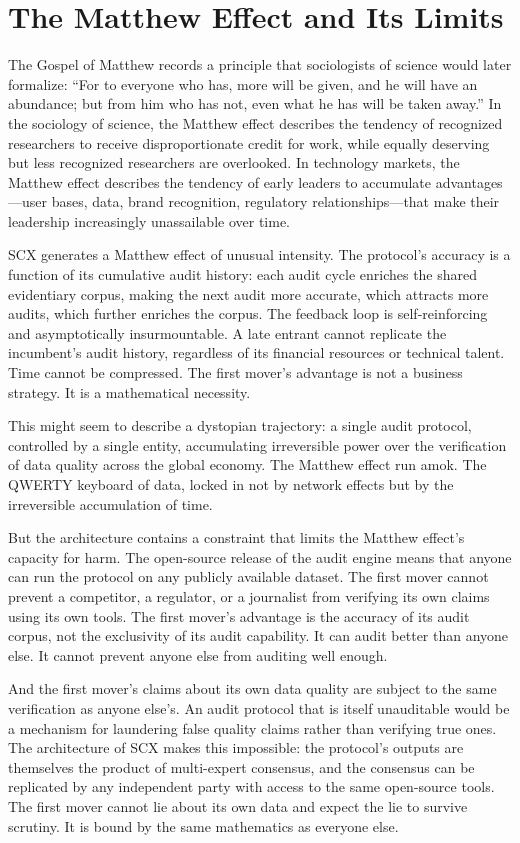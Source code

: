 \documentclass[12pt,a4paper]{article}
\begin{document}
\section{The Matthew Effect and Its Limits}

The Gospel of Matthew records a principle that sociologists of science would later formalize: ``For to everyone who has, more will be given, and he will have an abundance; but from him who has not, even what he has will be taken away.'' In the sociology of science, the Matthew effect describes the tendency of recognized researchers to receive disproportionate credit for work, while equally deserving but less recognized researchers are overlooked. In technology markets, the Matthew effect describes the tendency of early leaders to accumulate advantages---user bases, data, brand recognition, regulatory relationships---that make their leadership increasingly unassailable over time.

SCX generates a Matthew effect of unusual intensity. The protocol's accuracy is a function of its cumulative audit history: each audit cycle enriches the shared evidentiary corpus, making the next audit more accurate, which attracts more audits, which further enriches the corpus. The feedback loop is self-reinforcing and asymptotically insurmountable. A late entrant cannot replicate the incumbent's audit history, regardless of its financial resources or technical talent. Time cannot be compressed. The first mover's advantage is not a business strategy. It is a mathematical necessity.

This might seem to describe a dystopian trajectory: a single audit protocol, controlled by a single entity, accumulating irreversible power over the verification of data quality across the global economy. The Matthew effect run amok. The QWERTY keyboard of data, locked in not by network effects but by the irreversible accumulation of time.

But the architecture contains a constraint that limits the Matthew effect's capacity for harm. The open-source release of the audit engine means that anyone can run the protocol on any publicly available dataset. The first mover cannot prevent a competitor, a regulator, or a journalist from verifying its own claims using its own tools. The first mover's advantage is the accuracy of its audit corpus, not the exclusivity of its audit capability. It can audit better than anyone else. It cannot prevent anyone else from auditing well enough.

And the first mover's claims about its own data quality are subject to the same verification as anyone else's. An audit protocol that is itself unauditable would be a mechanism for laundering false quality claims rather than verifying true ones. The architecture of SCX makes this impossible: the protocol's outputs are themselves the product of multi-expert consensus, and the consensus can be replicated by any independent party with access to the same open-source tools. The first mover cannot lie about its own data and expect the lie to survive scrutiny. It is bound by the same mathematics as everyone else.
\end{document}
